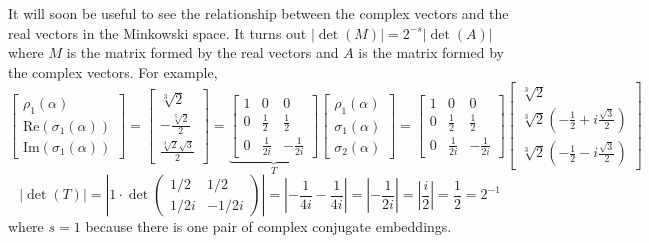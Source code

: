\documentclass[12pt]{article}
\theoremstyle{definition}
\begin{document}
It will soon be useful to see the relationship between the complex vectors and the real vectors in the Minkowski space. It turns out
$|\det(M)| = 2^{-s}|\det(A)|$ where $M$ is the matrix formed by the real vectors and $A$ is the matrix formed by the complex vectors.
For example,
\[
    \begin{bmatrix} \rho_1(\alpha) \\ \text{Re}(\sigma_1(\alpha)) \\ \text{Im}(\sigma_1(\alpha)) \end{bmatrix}
    = \begin{bmatrix}
    \sqrt[3]{2} \\ -\frac{\sqrt[3]{2}}{2} \\ \frac{\sqrt[3]{2}\sqrt{3}}{2}
    \end{bmatrix}
    = \underbrace{\begin{bmatrix}1 & 0 & 0 \\ 0 & \frac{1}{2} & \frac{1}{2} \\ 0 & \frac{1}{2i} & -\frac{1}{2i} \end{bmatrix}}_{T}
    \begin{bmatrix}
    \rho_1(\alpha) \\ \sigma_1(\alpha) \\ \sigma_2(\alpha)
    \end{bmatrix}
    = \begin{bmatrix}1 & 0 & 0 \\ 0 & \frac{1}{2} & \frac{1}{2} \\ 0 & \frac{1}{2i} & -\frac{1}{2i} \end{bmatrix}
    \begin{bmatrix}
    \sqrt[3]{2} \\ \sqrt[3]{2}(-\frac{1}{2} + i\frac{\sqrt{3}}{2}) \\ \sqrt[3]{2}(-\frac{1}{2} - i\frac{\sqrt{3}}{2})
    \end{bmatrix}
\]
\[
    |\det(T)| = |1 \cdot \det\begin{pmatrix} 1/2 & 1/2 \\ 1/2i & -1/2i \end{pmatrix}| = |-\frac{1}{4i} - \frac{1}{4i}| = |-\frac{1}{2i}| = |\frac{i}{2}| = \frac{1}{2} = 2^{-1}
\]
where $s=1$ because there is one pair of complex conjugate embeddings. 
\end{document}
